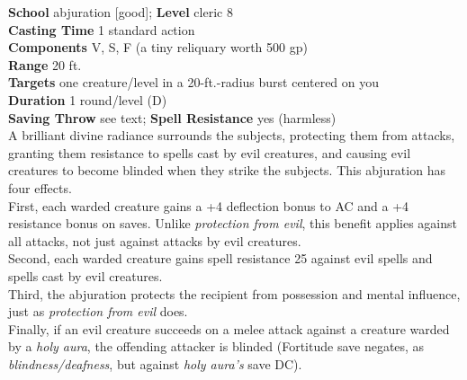 \textbf{School} abjuration [good]; \textbf{Level} cleric 8\\
\textbf{Casting Time} 1 standard action\\
\textbf{Components} V, S, F (a tiny reliquary worth 500 gp)\\
\textbf{Range} 20 ft.\\
\textbf{Targets} one creature/level in a 20-ft.-radius burst centered on you\\
\textbf{Duration} 1 round/level (D)\\
\textbf{Saving Throw} see text; \textbf{Spell Resistance} yes (harmless)\\
A brilliant divine radiance surrounds the subjects, protecting them from attacks, granting them resistance to spells cast by evil creatures, and causing evil creatures to become blinded when they strike the subjects. This abjuration has four effects.\\
First, each warded creature gains a +4 deflection bonus to AC and a +4 resistance bonus on saves. Unlike \textit{protection from evil}, this benefit applies against all attacks, not just against attacks by evil creatures.\\
Second, each warded creature gains spell resistance 25 against evil spells and spells cast by evil creatures.\\
Third, the abjuration protects the recipient from possession and mental influence, just as \textit{protection from evil }does.\\
Finally, if an evil creature succeeds on a melee attack against a creature warded by a \textit{holy aura}, the offending attacker is blinded (Fortitude save negates, as \textit{blindness/deafness}, but against \textit{holy aura's }save DC).\\
